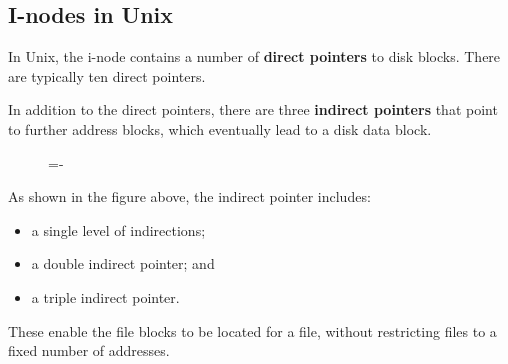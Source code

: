 \documentclass[a4paper]{systems-software}
\begin{document}
\subsection*{I-nodes in Unix}

In Unix, the i-node contains a number of \textbf{direct pointers} to disk blocks. There are typically ten direct pointers.

In addition to the direct pointers, there are three \textbf{indirect pointers} that point to further address blocks, which eventually lead to a disk data block.

\begin{figure}[H]
  \lineskip=-\fboxrule
\end{figure}

As shown in the figure above, the indirect pointer includes:
\begin{itemize}
	\item a single level of indirections;
	\item a double indirect pointer; and
	\item a triple indirect pointer.
\end{itemize}

These enable the file blocks to be located for a file, without restricting files to a fixed number of addresses.
\end{document}
